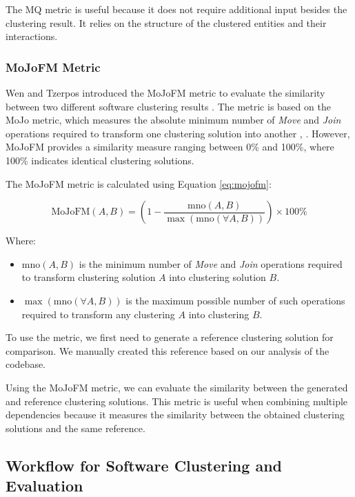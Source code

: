 \documentclass{ieeeaccess}
\begin{document}
The MQ metric is useful because it does not require additional input besides the clustering result. It relies on the structure of the clustered entities and their interactions.

\subsubsection{MoJoFM Metric}
\label{subsec:mojofm}
Wen and Tzerpos introduced the MoJoFM metric to evaluate the similarity between two different software clustering results \cite{mojofm}. The metric is based on the MoJo metric, which measures the absolute minimum number of \textit{Move} and \textit{Join} operations required to transform one clustering solution into another \cite{b3}, \cite{mojofm}. However, MoJoFM provides a similarity measure ranging between 0\% and 100\%, where 100\% indicates identical clustering solutions.

The MoJoFM metric is calculated using Equation \eqref{eq:mojofm}:

\begin{equation}
\text{MoJoFM}(A, B) = \left(1 - \frac{\text{mno}(A, B)}{\max(\text{mno}(\forall A, B))}\right) \times 100\%
\label{eq:mojofm}
\end{equation}

Where:

\begin{itemize}
\item $\text{mno}(A, B)$ is the minimum number of \textit{Move} and \textit{Join} operations required to transform clustering solution $A$ into clustering solution $B$.
\item $\max(\text{mno}(\forall A, B))$ is the maximum possible number of such operations required to transform any clustering $A$ into clustering $B$.
\end{itemize}

To use the metric, we first need to generate a reference clustering solution for comparison. We manually created this reference based on our analysis of the codebase.

Using the MoJoFM metric, we can evaluate the similarity between the generated and reference clustering solutions. This metric is useful when combining multiple dependencies because it measures the similarity between the obtained clustering solutions and the same reference.


\subsection{Workflow for Software Clustering and Evaluation}
\label{subsec:tool_workflow}
\end{document}
